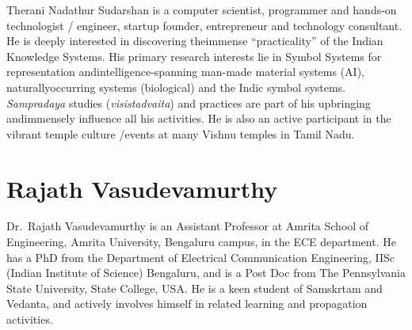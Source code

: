 Therani Nadathur Sudarshan is a computer scientist, programmer and hands-on technologist / engineer, startup founder, entrepreneur and technology consultant. He is deeply interested in discovering the\break immense “practicality” of the Indian Knowledge Systems. His primary research interests lie in Symbol Systems for representation and\break intelligence-spanning man-made material systems (AI), naturally\break occurring systems (biological) and the Indic symbol systems. {\sl Sampradaya} studies ({\sl visistadvaita}) and practices are part of his upbringing and\break immensely influence all his activities. He is also an active participant in the vibrant temple culture /events at many Vishnu temples in Tamil Nadu.

\section*{Rajath Vasudevamurthy}

Dr.~Rajath Vasudevamurthy is an Assistant Professor at Amrita School of Engineering, Amrita University, Bengaluru campus, in the ECE department. He has a PhD from the Department of Electrical Communication Engineering, IISc (Indian Institute of Science) Bengaluru, and is a Post Doc from The Pennsylvania State University, State College, USA. He is a keen student of Samskrtam and Vedanta, and actively involves himself in related learning and propagation activities.


